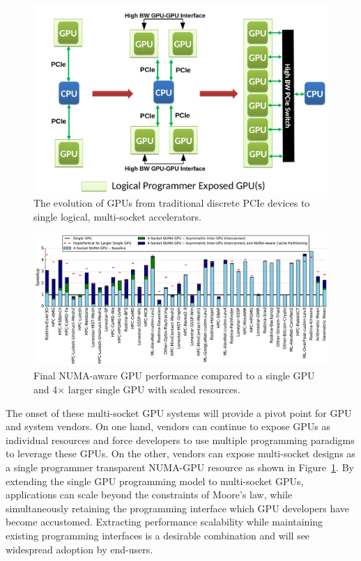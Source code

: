 \documentclass{sig-alternate}
\begin{document}
\begin{figure}[t]
	\centering
	\includegraphics[width=1.0\columnwidth]{figures/inter_gpu_connections.pdf}
	\caption{The evolution of GPUs from traditional discrete PCIe devices to 
		single logical, multi-socket accelerators.}
	\label{fig:systemdiagram}
\end{figure}

\begin{figure}[!t]
	\centering
	\includegraphics[width=1.0\textwidth]{figures/plot_final_speedup_WB_nvlink_first.pdf}
	\caption{Final NUMA-aware GPU performance compared to a single GPU and 4$\times$ larger single GPU with scaled resources.}
	\label{fig:combined}
\end{figure}
The onset of these multi-socket GPU systems will provide a pivot point for GPU 
and system vendors. On one hand, vendors can continue to expose GPUs as 
individual resources and force developers to use multiple programming paradigms 
to leverage these GPUs. On the other, vendors can expose multi-socket designs as 
a single programmer transparent NUMA-GPU resource as shown in 
Figure~\ref{fig:systemdiagram}.  By extending the single GPU programming model 
to multi-socket GPUs, applications can scale beyond the constraints of Moore's 
law, while simultaneously retaining the programming interface which GPU 
developers have become accustomed. Extracting performance 
scalability while maintaining existing programming interfaces is a desirable 
combination and will see widespread adoption by end-users.
\end{document}
